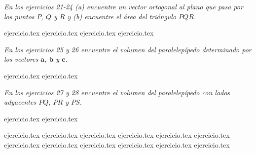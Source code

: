 \vspace{0.3cm}
\noindent\textit{En los ejercicios 21-24 (a) encuentre un vector ortogonal al plano que pasa por los puntos $P$, $Q$ y $R$ y (b) encuentre el área del triángulo $PQR$.}

\begin{enumerate}
    \setcounter{enumi}{20}
    {ejercicio.tex}
{ejercicio.tex}
{ejercicio.tex}
{ejercicio.tex}
\end{enumerate}

\vspace{0.3cm}
\noindent\textit{En los ejercicios 25 y 26 encuentre el volumen del paralelepípedo determinado por los vectores $\mathbf{a}$, $\mathbf{b}$ y $\mathbf{c}$.}

\begin{enumerate}
    \setcounter{enumi}{24}
    {ejercicio.tex}
{ejercicio.tex}
\end{enumerate}

\vspace{0.3cm}
\noindent\textit{En los ejercicios 27 y 28 encuentre el volumen del paralelepípedo con lados adyacentes $PQ$, $PR$ y $PS$.}

\begin{enumerate}
    \setcounter{enumi}{26}
    {ejercicio.tex}
{ejercicio.tex}
\end{enumerate}

\vspace{0.3cm}
\begin{enumerate}
    \setcounter{enumi}{28}
    {ejercicio.tex}
{ejercicio.tex}
{ejercicio.tex}
{ejercicio.tex}
{ejercicio.tex}
{ejercicio.tex}
{ejercicio.tex}
{ejercicio.tex}
{ejercicio.tex}
{ejercicio.tex}
{ejercicio.tex}
{ejercicio.tex}
\end{enumerate}
